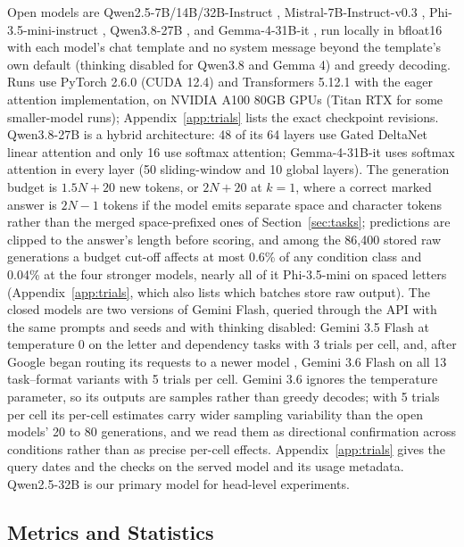 \documentclass[10pt]{article} %
\begin{document}
Open models are Qwen2.5-7B/14B/32B-Instruct \citep{qwen2024qwen25}, Mistral-7B-Instruct-v0.3 \citep{jiang2023mistral}, Phi-3.5-mini-instruct \citep{abdin2024phi3}, Qwen3.8-27B \citep{qwen2026qwen38}, and Gemma-4-31B-it \citep{gemma2026gemma4}, run locally in bfloat16 with each model's chat template and no system message beyond the template's own default (thinking disabled for Qwen3.8 and Gemma 4) and greedy decoding. Runs use PyTorch 2.6.0 (CUDA 12.4) and Transformers 5.12.1 with the eager attention implementation, on NVIDIA A100 80GB GPUs (Titan RTX for some smaller-model runs); Appendix~\ref{app:trials} lists the exact checkpoint revisions. Qwen3.8-27B is a hybrid architecture: 48 of its 64 layers use Gated DeltaNet linear attention \citep{yang2025gated} and only 16 use softmax attention; Gemma-4-31B-it uses softmax attention in every layer (50 sliding-window and 10 global layers). The generation budget is $1.5N + 20$ new tokens, or $2N + 20$ at $k = 1$, where a correct marked answer is $2N - 1$ tokens if the model emits separate space and character tokens rather than the merged space-prefixed ones of Section~\ref{sec:tasks}; predictions are clipped to the answer's length before scoring, and among the 86,400 stored raw generations a budget cut-off affects at most 0.6\% of any condition class and 0.04\% at the four stronger models, nearly all of it Phi-3.5-mini on spaced letters (Appendix~\ref{app:trials}, which also lists which batches store raw output). The closed models are two versions of Gemini Flash, queried through the API with the same prompts and seeds and with thinking disabled: Gemini 3.5 Flash \citep{gemini35flash} at temperature 0 on the letter and dependency tasks with 3 trials per cell, and, after Google began routing its requests to a newer model \citep{geminichangelog}, Gemini 3.6 Flash \citep{gemini36flash} on all 13 task--format variants with 5 trials per cell. Gemini 3.6 ignores the temperature parameter, so its outputs are samples rather than greedy decodes; with 5 trials per cell its per-cell estimates carry wider sampling variability than the open models' 20 to 80 generations, and we read them as directional confirmation across conditions rather than as precise per-cell effects. Appendix~\ref{app:trials} gives the query dates and the checks on the served model and its usage metadata. Qwen2.5-32B is our primary model for head-level experiments.

\subsection{Metrics and Statistics}
\end{document}
